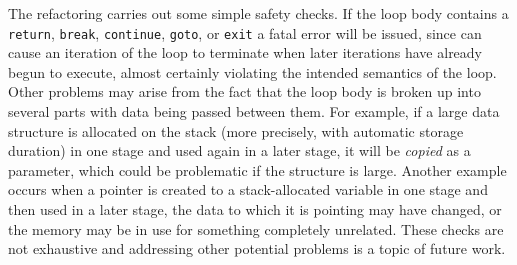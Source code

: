 The refactoring carries out some simple safety checks. If the loop
body contains a \texttt{return}, \texttt{break}, \texttt{continue},
\texttt{goto}, or \texttt{exit} a fatal error will be issued, since
can cause an iteration of the loop to terminate when later
iterations have already begun to execute, almost certainly violating the
intended semantics of the loop. Other problems may arise from the fact that the loop body is broken up
into several parts with data being passed between them. 
% 
  For example, if a large data structure is allocated on the stack (more precisely,
  with automatic storage duration) in one stage and used again in a
  later stage, it will be \emph{copied} as a parameter, which could be
  problematic if the structure is large.
  Another example occurs when a pointer is created to a stack-allocated variable in one stage and
  then used in a later stage, the data to which it is pointing may have
  changed, or the memory may be in use for something completely
  unrelated.
% 
These checks are not exhaustive and addressing other potential problems is a topic of future work.


